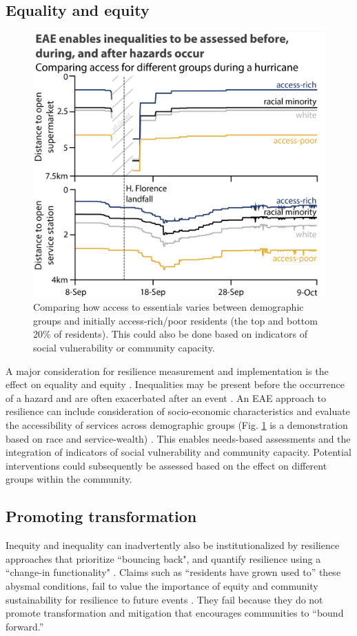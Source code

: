 \documentclass[onecolumn,doublespacing]{risa}
\let \cite \parencite
\begin{document}
\subsection{Equality and equity}

\begin{figure}
    \centering
    \includegraphics[width=0.5\linewidth]{report/fig/equality_NC.png}
    \caption{Comparing how access to essentials varies between demographic groups and initially access-rich/poor residents (the top and bottom 20\% of residents). This could also be done based on indicators of social vulnerability or community capacity.}
    \label{fig:equality}
\end{figure}

A major consideration for resilience measurement and implementation is the effect on equality and equity \cite{Matin2018-pg}.
Inequalities may be present before the occurrence of a hazard and are often exacerbated after an event \cite{Gardoni2018-xu}.
An EAE approach to resilience can include consideration of socio-economic characteristics and evaluate the accessibility of services across demographic groups (Fig. \ref{fig:equality} is a demonstration based on race and service-wealth) \cite{Williams_undated-sy}.
This enables needs-based assessments and the integration of indicators of social vulnerability and community capacity.
Potential interventions could subsequently be assessed based on the effect on different groups within the community.

\subsection{Promoting transformation}
Inequity and inequality can inadvertently also be institutionalized by resilience approaches that prioritize ``bouncing back", and quantify resilience using a ``change-in functionality" \cite{Normandin2019-hp, I_Sudmeier-Rieux2014-lc, MacKinnon2013-nx}.
Claims such as ``residents have grown used to'' these abysmal conditions, fail to value the importance of equity and community sustainability for resilience to future events \cite{Dempsey2011-og, Pantelic1991-qu}.
They fail because they do not promote transformation and mitigation that encourages communities to ``bound forward.''
\end{document}
